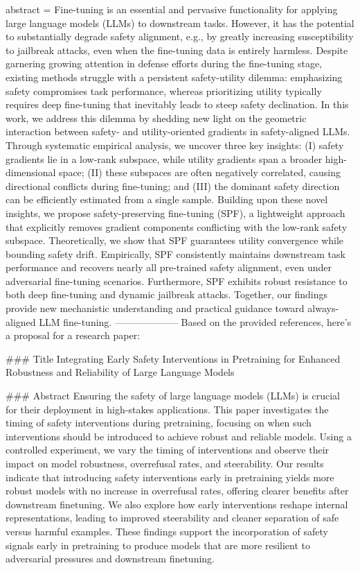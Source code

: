 {      abstract = {Fine-tuning is an essential and pervasive functionality for applying large language models (LLMs) to downstream tasks. However, it has the potential to substantially degrade safety alignment, e.g., by greatly increasing susceptibility to jailbreak attacks, even when the fine-tuning data is entirely harmless. Despite garnering growing attention in defense efforts during the fine-tuning stage, existing methods struggle with a persistent safety-utility dilemma: emphasizing safety compromises task performance, whereas prioritizing utility typically requires deep fine-tuning that inevitably leads to steep safety declination.   In this work, we address this dilemma by shedding new light on the geometric interaction between safety- and utility-oriented gradients in safety-aligned LLMs. Through systematic empirical analysis, we uncover three key insights: (I) safety gradients lie in a low-rank subspace, while utility gradients span a broader high-dimensional space; (II) these subspaces are often negatively correlated, causing directional conflicts during fine-tuning; and (III) the dominant safety direction can be efficiently estimated from a single sample. Building upon these novel insights, we propose safety-preserving fine-tuning (SPF), a lightweight approach that explicitly removes gradient components conflicting with the low-rank safety subspace. Theoretically, we show that SPF guarantees utility convergence while bounding safety drift. Empirically, SPF consistently maintains downstream task performance and recovers nearly all pre-trained safety alignment, even under adversarial fine-tuning scenarios. Furthermore, SPF exhibits robust resistance to both deep fine-tuning and dynamic jailbreak attacks. Together, our findings provide new mechanistic understanding and practical guidance toward always-aligned LLM fine-tuning.}
}
        --------------------
         Based on the provided references, here’s a proposal for a research paper:

### Title
Integrating Early Safety Interventions in Pretraining for Enhanced Robustness and Reliability of Large Language Models

### Abstract
Ensuring the safety of large language models (LLMs) is crucial for their deployment in high-stakes applications. This paper investigates the timing of safety interventions during pretraining, focusing on when such interventions should be introduced to achieve robust and reliable models. Using a controlled experiment, we vary the timing of interventions and observe their impact on model robustness, overrefusal rates, and steerability. Our results indicate that introducing safety interventions early in pretraining yields more robust models with no increase in overrefusal rates, offering clearer benefits after downstream finetuning. We also explore how early interventions reshape internal representations, leading to improved steerability and cleaner separation of safe versus harmful examples. These findings support the incorporation of safety signals early in pretraining to produce models that are more resilient to adversarial pressures and downstream finetuning.

